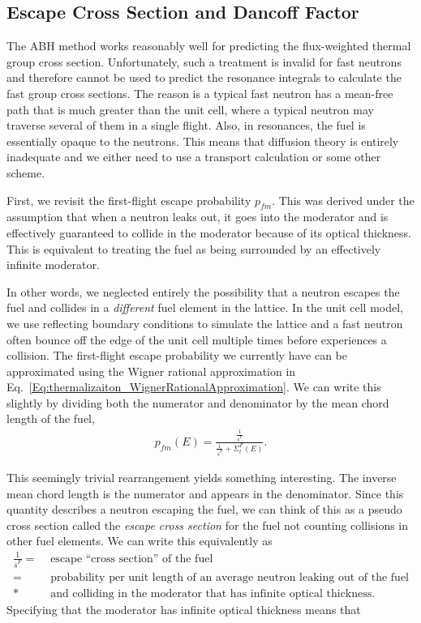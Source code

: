 \subsection{Escape Cross Section and Dancoff Factor}

The ABH method works reasonably well for predicting the flux-weighted thermal group cross section. Unfortunately, such a treatment is invalid for fast neutrons and therefore cannot be used to predict the resonance integrals to calculate the fast group cross sections. The reason is a typical fast neutron has a mean-free path that is much greater than the unit cell, where a typical neutron may traverse several of them in a single flight. Also, in resonances, the fuel is essentially opaque to the neutrons. This means that diffusion theory is entirely inadequate and we either need to use a transport calculation or some other scheme.

First, we revisit the first-flight escape probability $p_{fm}$. This was derived under the assumption that when a neutron leaks out, it goes into the moderator and is effectively guaranteed to collide in the moderator because of its optical thickness. This is equivalent to treating the fuel as being surrounded by an effectively infinite moderator.

In other words, we neglected entirely the possibility that a neutron escapes the fuel and collides in a \emph{different} fuel element in the lattice. In the unit cell model, we use reflecting boundary conditions to simulate the lattice and a fast neutron often bounce off the edge of the unit cell multiple times before experiences a collision. The first-flight escape probability we  currently have can be approximated using the Wigner rational approximation in Eq.~\eqref{Eq:thermalizaiton_WignerRationalApproximation}. We can write this slightly by dividing both the numerator and denominator by the mean chord length of the fuel,
\begin{align}
  p_{fm}(E) = \frac{ \frac{1}{\overline{s}^F} }{ \frac{1}{\overline{s}^F} + \Sigma_t^F(E) } .
\end{align}

This seemingly trivial rearrangement yields something interesting. The inverse mean chord length is the numerator and appears in the denominator. Since this quantity describes a neutron escaping the fuel, we can think of this as a pseudo cross section called the \emph{escape cross section} for the fuel not counting collisions in other fuel elements. We can write this equivalently as
\begin{align}
  \frac{1}{\overline{s}^F}
  = &\text{ escape ``cross section'' of the fuel} \nonumber \\
  = &\text{ probability per unit length of an average neutron leaking out of the fuel} \nonumber \\*
    &\text{ and colliding in the moderator that has infinite optical thickness.} \nonumber
\end{align}
Specifying that the moderator has infinite optical thickness means that 

